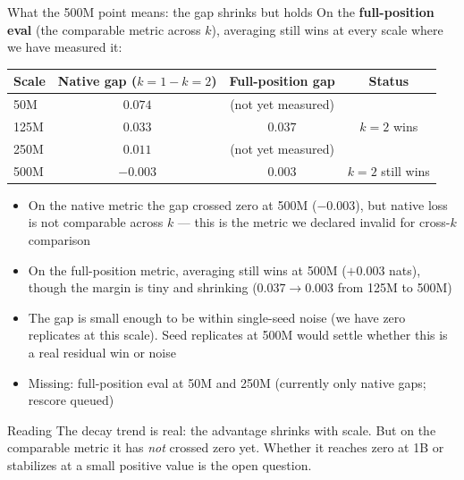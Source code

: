 \documentclass[10pt,aspectratio=169]{beamer}
\newcommand{\good}[1]{\textcolor{okgreen}{#1}}
\begin{document}
\begin{frame}{What the 500M point means: the gap shrinks but holds}
  \footnotesize
  On the \textbf{full-position eval} (the comparable metric across $k$),
  averaging still wins at every scale where we have measured it:

  \vspace{0.2em}
  \centering
  \begin{tabular}{lccc}
    \toprule
    Scale & Native gap ($k{=}1 - k{=}2$) & Full-position gap & Status \\
    \midrule
    50M   & $0.074$  & (not yet measured) & \\
    125M  & $0.033$  & \good{$0.037$}     & \good{$k{=}2$ wins} \\
    250M  & $0.011$  & (not yet measured)  & \\
    500M  & $-0.003$ & \good{$0.003$}     & \good{$k{=}2$ still wins} \\
    \bottomrule
  \end{tabular}

  \vspace{0.25em}
  \raggedright
  \begin{itemize}
    \item On the native metric the gap crossed zero at 500M ($-0.003$),
          but native loss is not comparable across $k$ --- this is the
          metric we declared invalid for cross-$k$ comparison
    \item On the full-position metric, \good{averaging still wins at 500M}
          ($+0.003$ nats), though the margin is tiny and shrinking
          ($0.037 \to 0.003$ from 125M to 500M)
    \item The gap is small enough to be within single-seed noise (we
          have zero replicates at this scale). Seed replicates at 500M
          would settle whether this is a real residual win or noise
    \item Missing: full-position eval at 50M and 250M (currently only
          native gaps; rescore queued)
  \end{itemize}

  \vspace{0.15em}
  \begin{alertblock}{Reading}
    The decay trend is real: the advantage shrinks with scale. But on the
    comparable metric it has \emph{not} crossed zero yet. Whether it
    reaches zero at 1B or stabilizes at a small positive value is the open
    question.
  \end{alertblock}
\end{frame}
\end{document}
